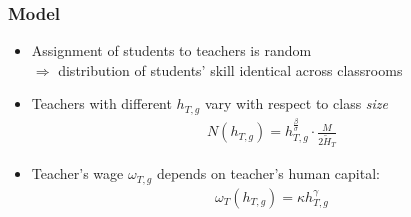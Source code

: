 \documentclass[11pt]{beamer}
\begin{document}
	\begin{frame}
		\frametitle{Model}
			\begin{itemize}
				\item Assignment of students to teachers is random \\ $\Rightarrow$ distribution of students' skill identical across classrooms
				\item Teachers with different $h_{T,g}$ vary with respect to class {\it size}
				\begin{align*}
                    N(h_{T,g})=h_{T,g}^\frac{\beta}{\sigma} \cdot \frac{M}{2\widetilde{H}_T}
				\end{align*}
				\item Teacher's wage $\omega_{T,g}$ depends on teacher's human capital:
				\begin{align*}
					\omega_T(h_{T,g})  =  \kappa h_{T,g}^\gamma 
	\end{align*}
\end{itemize}


\end{frame}
\end{document}
